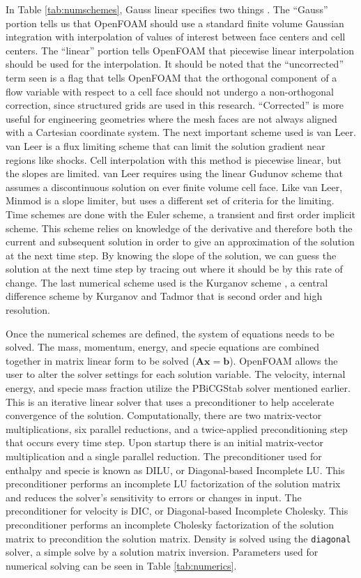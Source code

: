 In Table \ref{tab:numschemes}, Gauss linear specifies two things \cite{ofug}. The ``Gauss'' portion tells us that OpenFOAM should use a standard finite volume Gaussian integration with interpolation of values of interest between face centers and cell centers. The ``linear'' portion tells OpenFOAM that piecewise linear interpolation should be used for the interpolation. It should be noted that the ``uncorrected'' term seen is a flag that tells OpenFOAM that the orthogonal component of a flow variable with respect to a cell face should not undergo a non-orthogonal correction, since structured grids are used in this research. ``Corrected'' is more useful for engineering geometries where the mesh faces are not always aligned with a Cartesian coordinate system. The next important scheme used is van Leer. van Leer \cite{vanleer} is a flux limiting scheme that can limit the solution gradient near regions like shocks. Cell interpolation with this method is piecewise linear, but the slopes are limited. van Leer requires using the linear Gudunov scheme that assumes a discontinuous solution on ever finite volume cell face. Like van Leer, Minmod is a slope limiter, but uses a different set of criteria for the limiting. Time schemes are done with the Euler scheme, a transient and first order implicit scheme. This scheme relies on knowledge of the derivative and therefore both the current and subsequent solution in order to give an approximation of the solution at the next time step. By knowing the slope of the solution, we can guess the solution at the next time step by tracing out where it should be by this rate of change. The last numerical scheme used is the Kurganov scheme \cite{kurganov1}, a central difference scheme by Kurganov and Tadmor that is second order and high resolution. 

Once the numerical schemes are defined, the system of equations needs to be solved. The mass, momentum, energy, and specie equations are combined together in matrix linear form to be solved (\(\bm{Ax} = \bm{b}\)). OpenFOAM allows the user to alter the solver settings for each solution variable\cite{ofug}. The velocity, internal energy, and specie mass fraction utilize the PBiCGStab solver mentioned earlier. This is an iterative linear solver that uses a preconditioner to help accelerate convergence of the solution.  Computationally, there are two matrix-vector multiplications, six parallel reductions, and a twice-applied preconditioning step that occurs every time step. Upon startup there is an initial matrix-vector multiplication and a single parallel reduction. The preconditioner used for enthalpy and specie is known as DILU, or Diagonal-based Incomplete LU. This preconditioner performs an incomplete LU factorization of the solution matrix and reduces the solver's sensitivity to errors or changes in input. The preconditioner for velocity is DIC, or Diagonal-based Incomplete Cholesky. This preconditioner performs an incomplete Cholesky factorization of the solution matrix to precondition the solution matrix. Density is solved using the \verb|diagonal| solver, a simple solve by a solution matrix inversion. Parameters used for numerical solving can be seen in Table \ref{tab:numerics}. 

